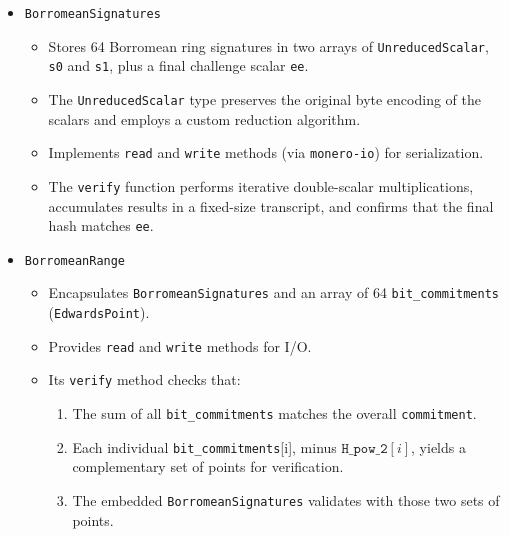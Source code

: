 \documentclass[12pt,a4paper]{article}
\begin{document}
\begin{itemize}
  \item \texttt{BorromeanSignatures}
    \begin{itemize}
      \item Stores 64 Borromean ring signatures in two arrays of \texttt{UnreducedScalar}, \texttt{s0} and \texttt{s1}, plus a final challenge scalar \texttt{ee}.
      \item The \texttt{UnreducedScalar} type preserves the original byte encoding of the scalars and employs a custom reduction algorithm.%
      \item Implements \texttt{read} and \texttt{write} methods (via \texttt{monero-io}) for serialization.%
      \item The \texttt{verify} function performs iterative double-scalar multiplications, accumulates results in a fixed-size transcript, and confirms that the final hash matches \texttt{ee}.%
    \end{itemize}

  \item \texttt{BorromeanRange}
    \begin{itemize}
      \item Encapsulates \texttt{BorromeanSignatures} and an array of 64 \texttt{bit\_commitments} (\texttt{EdwardsPoint}).
      \item Provides \texttt{read} and \texttt{write} methods for I/O.%
      \item Its \texttt{verify} method checks that:
        \begin{enumerate}[label=(\alph*)]
          \item The sum of all \texttt{bit\_commitments} matches the overall \texttt{commitment}.
          \item Each individual \texttt{bit\_commitments}[i], minus \(\texttt{H\_pow\_2}[i]\), yields a complementary set of points for verification.
          \item The embedded \texttt{BorromeanSignatures} validates with those two sets of points.%
        \end{enumerate}
    \end{itemize}
\end{itemize}
\end{document}
